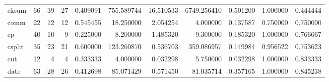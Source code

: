 \begin{longtable}{lrrrrrrrrrr}
cksum     &                                      66 &                 39 &                                27 &                                   0.409091 &                             755.589744 &                                    16.510533 &                       6749.256410 &                                0.501200 &                           1.000000 &                                           0.444444 \\
comm      &                                      22 &                 12 &                                12 &                                   0.545455 &                              18.250000 &                                     2.054254 &                          4.000000 &                                0.137587 &                           0.750000 &                                           0.750000 \\
cp        &                                      40 &                 10 &                                 9 &                                   0.225000 &                               8.200000 &                                     1.485320 &                          9.300000 &                                0.185320 &                           1.000000 &                                           0.766667 \\
csplit    &                                      35 &                 23 &                                21 &                                   0.600000 &                             123.260870 &                                     0.536703 &                        359.086957 &                                0.149984 &                           0.956522 &                                           0.753623 \\
cut       &                                      12 &                  4 &                                 4 &                                   0.333333 &                               4.000000 &                                     0.032298 &                          5.750000 &                                0.032298 &                           1.000000 &                                           0.833333 \\
date      &                                      63 &                 28 &                                26 &                                   0.412698 &                              85.071429 &                                     0.571450 &                         81.035714 &                                0.357165 &                           1.000000 &                                           0.845238 \\

\end{longtable}

